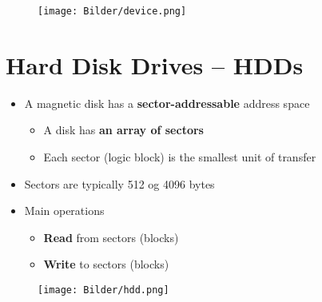 \documentclass[a4paper,11pt,english]{article}
\begin{document}
\begin{figure}[H]
    \centering 
    \texttt{[image: Bilder/device.png]}
\end{figure}

\section*{Hard Disk Drives -- HDDs}
\begin{itemize}
    \item A magnetic disk has a \textbf{\color{blue} sector-addressable} address space 
        \begin{itemize}
            \item A disk has \textbf{\color{blue} an array of sectors}
            \item Each sector (logic block) is the smallest unit of transfer
        \end{itemize}
    \item Sectors are typically 512 og 4096 bytes
    \item Main operations
        \begin{itemize}
            \item \textbf{\color{blue} Read} from sectors (blocks)
            \item \textbf{\color{blue} Write} to sectors (blocks)
        \end{itemize}
\end{itemize}

\begin{figure}[H]
    \centering 
    \texttt{[image: Bilder/hdd.png]}
\end{figure}
\end{document}

